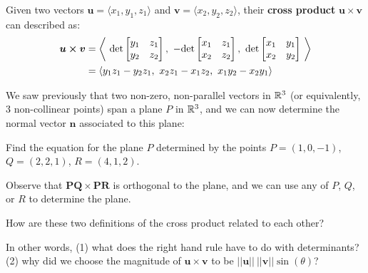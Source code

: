 \begin{theorem}\label{crossprodcomponents}
    
    Given two vectors $\bm{u} = \langle x_1, y_1, z_1 \rangle$ and $\bm{v}= \langle x_2, y_2, z_2 \rangle$, their \textbf{cross product} $\bm{u \times v}$ can described as:
    \begin{align*} \bm{u \times v} &= 
\left\langle \  \textnormal{det}\begin{bmatrix}
y_1 & z_1 \\
y_2 & z_2
\end{bmatrix}, \  - \textnormal{det}\begin{bmatrix}
x_1 & z_1 \\
x_2 & z_2
\end{bmatrix}, \ \textnormal{det}\begin{bmatrix}
x_1 & y_1  \\
x_2 & y_2  \\
\end{bmatrix} \ \right\rangle \\
&= 
\langle y_1z_1 - y_2z_1, \ x_2z_1 - x_1z_2, \ x_1y_2-x_2y_1  \rangle \\
\end{align*}
    
\end{theorem}


We saw previously that two non-zero, non-parallel vectors in $\mathbb{R}^3$ (or equivalently, 3 non-collinear points) span a plane $P$ in $\mathbb{R}^3$, and we can now determine the normal vector $\bm{n}$ associated to this plane:

\begin{example}
    Find the equation for the plane $P$ determined by the points $P = (1,0,-1)$, $Q = (2,2,1)$, $R = (4,1,2)$.
    
    Observe that $\bm{PQ} \times \bm{PR}$ is orthogonal to the plane, and we can use any of $P$, $Q$, or $R$ to determine the plane.
\end{example}



\begin{motivating}
How are these two definitions of the cross product related to each other?
\end{motivating}

In other words, (1) what does the right hand rule have to do with determinants?  (2) why did we choose the magnitude of $\bm{u \times v}$ to be $||\bm{u}|| \ ||\bm{v}|| \sin(\theta)$?

